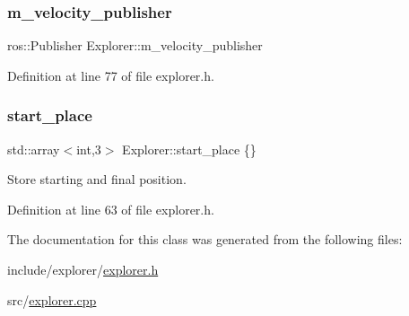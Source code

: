 \mbox{\label{class_explorer_aee857cd646f2ce6eb7e017a67e90bcdf}} 
\subsubsection{\texorpdfstring{m\+\_\+velocity\+\_\+publisher}{m\_velocity\_publisher}}
{\footnotesize\ttfamily ros\+::\+Publisher Explorer\+::m\+\_\+velocity\+\_\+publisher}



Definition at line 77 of file explorer.\+h.

\mbox{\label{class_explorer_af1aee46522a58db39d3643f2138c76fa}} 
\subsubsection{\texorpdfstring{start\+\_\+place}{start\_place}}
{\footnotesize\ttfamily std\+::array$<$int,3$>$ Explorer\+::start\+\_\+place \{\}}



Store starting and final position. 



Definition at line 63 of file explorer.\+h.



The documentation for this class was generated from the following files\+:\begin{DoxyCompactItemize}
\item 
include/explorer/\hyperlink{explorer_8h}{explorer.\+h}\item 
src/\hyperlink{explorer_8cpp}{explorer.\+cpp}\end{DoxyCompactItemize}
